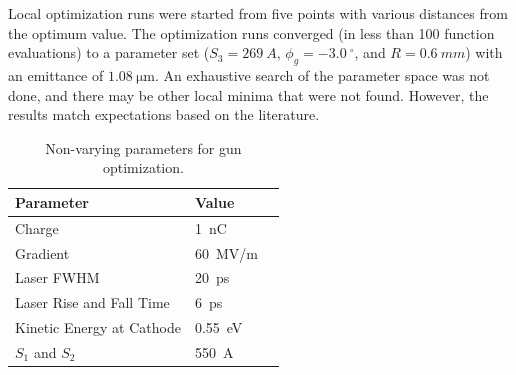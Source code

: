 \documentclass{iitthesis}
\begin{document}
Local optimization runs were started from five points with various distances from the optimum value. The optimization runs converged 
(in less than 100 function evaluations) to a parameter set ($S_3=\SI{269}{A}$, $\phi_g=\SI{-3.0}{^{\circ}}$, and $R=\SI{0.6}{mm}$) 
with an emittance of $\SI{1.08}{\um}$.
An exhaustive search of the parameter space was not done, and there may be other local minima that were not found.
However, the results match expectations based on the literature. 
\begin{table}[h] 
	\caption{\label{tab:gun} Non-varying parameters for gun optimization.}
	\begin{center}
		\begin{tabular}{lll}
			\toprule
			\textbf{Parameter} & \textbf{Value} \\
			\midrule
			Charge  & \SI{1}{nC} \\
			Gradient & \SI{60}{MV/m} \\
			Laser FWHM & \SI{20}{ps} \\
			Laser Rise and Fall Time & \SI{6}{ps} \\
			Kinetic Energy at Cathode  & \SI{0.55}{eV} \\
			$S_1$ and $S_2$ & \SI{550}{A} \\
			\bottomrule
		\end{tabular}
	\end{center}
\end{table}
\end{document}
